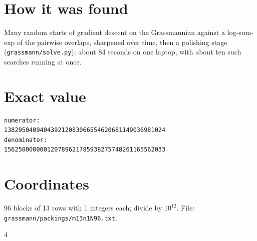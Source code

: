 \documentclass[11pt,a4paper]{article}
\begin{document}
\section{How it was found}
Many random starts of gradient descent on the Grassmannian against a log-sum-exp of the pairwise overlaps, sharpened over time, then a polishing stage (\texttt{grassmann/solve.py}); about 84 seconds on one laptop, with about ten such searches running at once.


\appendix
\section{Exact value}
{\small
\begin{verbatim}
numerator:
138295040940439212083066554620681149036981024
denominator:
156250000000120789621785938275748261165562033
\end{verbatim}}

\section{Coordinates}
96 blocks of 13 rows with 1 integers each; divide by $10^{12}$. File: \texttt{grassmann/packings/m13n1N96.txt}.
{\tiny
\begin{multicols}{4}
\end{multicols}}
\end{document}

